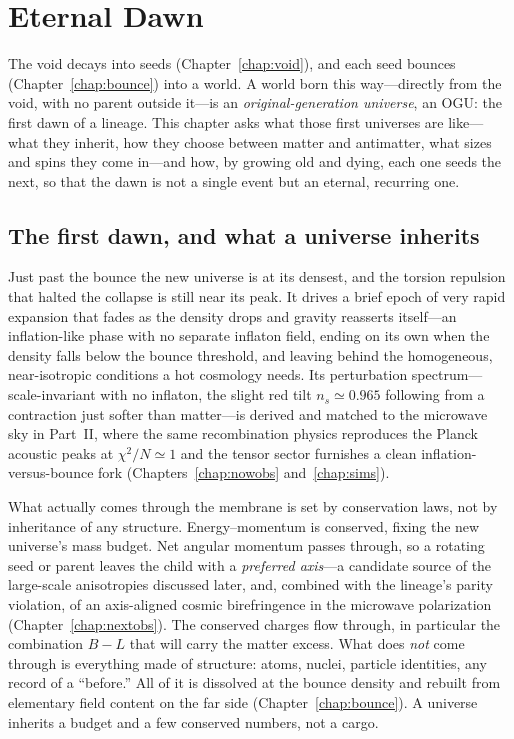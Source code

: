 \chapter{Eternal Dawn}
\label{chap:dawn}

The void decays into seeds (Chapter~\ref{chap:void}), and each seed bounces
(Chapter~\ref{chap:bounce}) into a world. A world born this way---directly from
the void, with no parent outside it---is an \emph{original-generation universe},
an OGU: the first dawn of a lineage. This chapter asks what those first universes
are like---what they inherit, how they choose between matter and antimatter, what
sizes and spins they come in---and how, by growing old and dying, each one seeds
the next, so that the dawn is not a single event but an eternal, recurring one.

\section{The first dawn, and what a universe inherits}
\label{sec:first-dawn}

Just past the bounce the new universe is at its densest, and the torsion
repulsion that halted the collapse is still near its peak. It drives a brief
epoch of very rapid expansion that fades as the density drops and gravity
reasserts itself---an inflation-like phase with no separate inflaton field,
ending on its own when the density falls below the bounce threshold, and leaving
behind the homogeneous, near-isotropic conditions a hot cosmology needs. Its
perturbation spectrum---scale-invariant with no inflaton, the slight red tilt
$n_s\simeq0.965$ following from a contraction just softer than matter---is derived
and matched to the microwave sky in Part~II, where the same recombination physics
reproduces the Planck acoustic peaks at $\chi^2/N\simeq1$ and the tensor sector
furnishes a clean inflation-versus-bounce fork
(Chapters~\ref{chap:nowobs} and~\ref{chap:sims}).

What actually comes through the membrane is set by conservation laws, not by
inheritance of any structure. Energy--momentum is conserved, fixing the new
universe's mass budget. Net angular momentum passes through, so a rotating seed or
parent leaves the child with a \emph{preferred axis}---a candidate source of the
large-scale anisotropies discussed later, and, combined with the lineage's parity
violation, of an axis-aligned cosmic birefringence in the microwave polarization
(Chapter~\ref{chap:nextobs}). The conserved charges flow through, in
particular the combination $B-L$ that will carry the matter excess. What does
\emph{not} come through is everything made of structure: atoms, nuclei, particle
identities, any record of a ``before.'' All of it is dissolved at the bounce
density and rebuilt from elementary field content on the far side
(Chapter~\ref{chap:bounce}). A universe inherits a budget and a few conserved
numbers, not a cargo.


